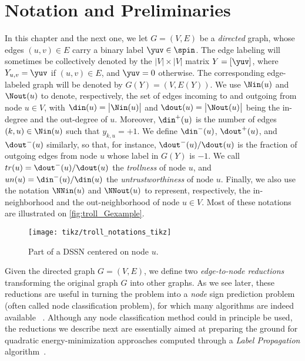 \section{Notation and Preliminaries}\label{s:prel}

In this chapter and the next one, we let $G=(V,E)$ be a \emph{directed} graph, whose edges $(u,v)
\in E$ carry a
binary label $\yuv\in \spin$. The edge labeling will sometimes be collectively denoted by the
$|V|\times |V|$ matrix $Y = [\yuv]$, where $Y_{u,v} = \yuv$ if $(u,v) \in E$, and $\yuv = 0$
otherwise. The corresponding edge-labeled graph will be denoted by $G(Y) = (V,E(Y))$. We use
$\Nin(u)$ and $\Nout(u)$ to denote, respectively, the set of edges incoming to and outgoing from
node $u \in V$, with $\din(u) = \big|\Nin(u)\big|$ and $\dout(u) = \big|\Nout(u)\big|$ being the
in-degree and the out-degree of $u$. Moreover, $\din^+(u)$ is the number of edges $(k,u)\in\Nin(u)$
such that $y_{k,u} = +1$. We define $\din^-(u)$, $\dout^+(u)$, and $\dout^-(u)$ similarly, so that,
for instance, $\dout^-(u)/\dout(u)$ is the fraction of outgoing edges from node $u$ whose label in
$G(Y)$ is $-1$. We call $tr(u) = \dout^-(u)/\dout(u)$ the \emph{trollness} of node $u$, and $un(u)
= \din^-(u)/\din(u)$ the \emph{untrustworthiness} of node $u$. Finally, we also use the notation
$\NNin(u)$ and $\NNout(u)$ to represent, respectively, the in-neighborhood and the out-neighborhood
of node $u \in V$. Most of these notations are illustrated on \autoref{fig:troll_Gexample}.
\begin{figure}[htpb]
  \centering
  \texttt{[image: tikz/troll\_notations\_tikz]}
  \caption{Part of a DSSN centered on node $u$. \label{fig:troll_Gexample}}
\end{figure}

Given the directed graph $G = (V,E)$, we define two \emph{edge-to-node reductions} transforming the
original graph $G$ into other graphs. As we see later, these reductions are useful in turning the
\esp{} problem into a \emph{node} sign prediction problem (often called node
classification problem), for which many algorithms are indeed available~%
\autocites{BC01}{LabelPropa03}{BDL06}{HP07}{HLP09}{Vitale2012}{HPV12}{WTA13}{HPG15}.  Although any
node classification method could in principle be used, the reductions we describe next are
essentially aimed at preparing the ground for quadratic energy-minimization approaches computed
through a \emph{Label Propagation} algorithm~\autocites{LabelPropa03}{BDL06}.

